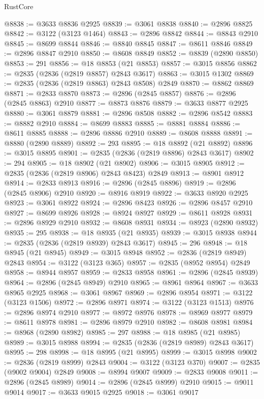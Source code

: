 \begin{lexlean}{RustCore}
\begin{coremodule}
@8838 := @3633 @8836 @2925
@8839 := @3061 @8838
@8840 := @2896 @8825
@8842 := @3122 (@3123 @1464)
@8843 := @2896 @8842
@8844 := @8843 @2910
@8845 := @8699 @8844
@8846 := @8840 @8845
@8847 := @8611 @8846
@8849 := @2896 @8847 @2910
@8850 := @8608 @8849
@8852 := @8839 (@2890 @8850)
@8853 := 291
@8856 := @18 @8853 (@21 @8853)
@8857 := @3015 @8856
@8862 := @2835 (@2836 (@2819 @8857) @2843 @3617)
@8863 := @3015 @1302
@8869 := @2835 (@2836 (@2819 @8863) @2843 @8508) @2849
@8870 := @8862 @8869
@8871 := @2833 @8870
@8873 := @2896 (@2845 @8857)
@8876 := @2896 (@2845 @8863) @2910
@8877 := @8873 @8876
@8879 := @3633 @8877 @2925
@8880 := @3061 @8879
@8881 := @2896 @8508
@8882 := @2896 @8542
@8883 := @8882 @2910
@8884 := @8699 @8883
@8885 := @8881 @8884
@8886 := @8611 @8885
@8888 := @2896 @8886 @2910
@8889 := @8608 @8888
@8891 := @8880 (@2890 @8889)
@8892 := 293
@8895 := @18 @8892 (@21 @8892)
@8896 := @3015 @8895
@8901 := @2835 (@2836 (@2819 @8896) @2843 @3617)
@8902 := 294
@8905 := @18 @8902 (@21 @8902)
@8906 := @3015 @8905
@8912 := @2835 (@2836 (@2819 @8906) @2843 @8423) @2849
@8913 := @8901 @8912
@8914 := @2833 @8913
@8916 := @2896 (@2845 @8896)
@8919 := @2896 (@2845 @8906) @2910
@8920 := @8916 @8919
@8922 := @3633 @8920 @2925
@8923 := @3061 @8922
@8924 := @2896 @8423
@8926 := @2896 @8457 @2910
@8927 := @8699 @8926
@8928 := @8924 @8927
@8929 := @8611 @8928
@8931 := @2896 @8929 @2910
@8932 := @8608 @8931
@8934 := @8923 (@2890 @8932)
@8935 := 295
@8938 := @18 @8935 (@21 @8935)
@8939 := @3015 @8938
@8944 := @2835 (@2836 (@2819 @8939) @2843 @3617)
@8945 := 296
@8948 := @18 @8945 (@21 @8945)
@8949 := @3015 @8948
@8952 := @2836 (@2819 @8949) @2843
@8954 := @3122 (@3123 @365)
@8957 := @2835 (@8952 @8954) @2849
@8958 := @8944 @8957
@8959 := @2833 @8958
@8961 := @2896 (@2845 @8939)
@8964 := @2896 (@2845 @8949) @2910
@8965 := @8961 @8964
@8967 := @3633 @8965 @2925
@8968 := @3061 @8967
@8969 := @2896 @8954
@8971 := @3122 (@3123 @1506)
@8972 := @2896 @8971
@8974 := @3122 (@3123 @1513)
@8976 := @2896 @8974 @2910
@8977 := @8972 @8976
@8978 := @8969 @8977
@8979 := @8611 @8978
@8981 := @2896 @8979 @2910
@8982 := @8608 @8981
@8984 := @8968 (@2890 @8982)
@8985 := 297
@8988 := @18 @8985 (@21 @8985)
@8989 := @3015 @8988
@8994 := @2835 (@2836 (@2819 @8989) @2843 @3617)
@8995 := 298
@8998 := @18 @8995 (@21 @8995)
@8999 := @3015 @8998
@9002 := @2836 (@2819 @8999) @2843
@9004 := @3122 (@3123 @370)
@9007 := @2835 (@9002 @9004) @2849
@9008 := @8994 @9007
@9009 := @2833 @9008
@9011 := @2896 (@2845 @8989)
@9014 := @2896 (@2845 @8999) @2910
@9015 := @9011 @9014
@9017 := @3633 @9015 @2925
@9018 := @3061 @9017

\end{coremodule}
\end{lexlean}
